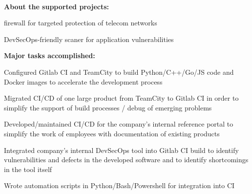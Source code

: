 \documentclass[a4paper]{MagicalCV}
\begin{document}
\begin{minipage}[t]{0.64\textwidth}
 \\
\vspace{\topsep} %
\textbf{About the supported projects:} 
\begin{tightemize}
  \item firewall for targeted protection of telecom networks
  \item DevSecOps-friendly scaner for application vulnerabilities
\end{tightemize}
\textbf{Major tasks accomplished:}
\begin{tightemize}
  \item Configured Gitlab CI and TeamCity to build Python/C++/Go/JS code and Docker images to accelerate the development process
  \item Migrated CI/CD of one large product from TeamCity to Gitlab CI in order to simplify the support of build processes / debug of emerging problems
  \item Developed/maintained CI/CD for the company's internal reference portal to simplify the work of employees with documentation of existing products
  \item Integrated company's internal DevSecOps tool into Gitlab CI build to identify vulnerabilities and defects in the developed software and to identify shortcomings in the tool itself
  \item Wrote automation scripts in Python/Bash/Powershell for integration into CI
\end{tightemize}
\sectionsep

\end{minipage} 
\end{document}
